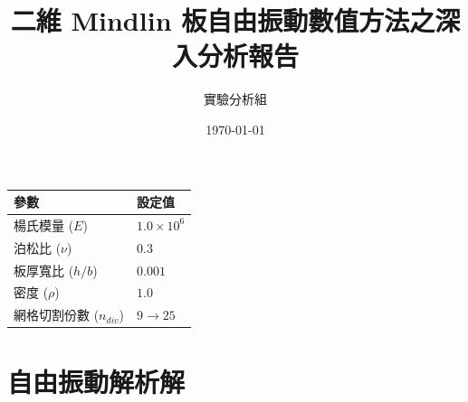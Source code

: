 \documentclass[a4paper,12pt]{article}
\title{二維 Mindlin 板自由振動數值方法之深入分析報告}
\author{實驗分析組}
\date{\today}
\begin{document}
\maketitle

\begin{table}[h]
\centering
\begin{tabular}{ll}
\toprule
參數 & 設定值 \\
\midrule
楊氏模量 ($E$) & $1.0 \times 10^6$ \\
泊松比 ($\nu$) & $0.3$ \\
板厚寬比 ($h/b$) & $0.001$ \\
密度 ($\rho$) & $1.0$ \\
網格切割份數 ($n_{div}$) & $9 \to 25$ \\
\bottomrule
\end{tabular}
\end{table}

\section{自由振動解析解}
\end{document}
